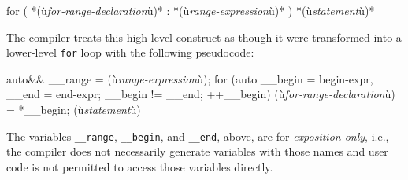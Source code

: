 
\begin{emcppslisting}
for ( *(ù{\it{for-range-declaration}}ù)* : *(ù{\it{range-expression}}ù)* ) *(ù{\it{statement}}ù)*
\end{emcppslisting}
    

\noindent The compiler treats this high-level construct as though it were
transformed into a lower-level \lstinline!for! loop with the following
pseudocode:


\begin{emcppslisting}
{
    auto&& __range = (ù{\it{range-expression}}ù);
    for (auto __begin = begin-expr, __end = end-expr;
        __begin != __end;
        ++__begin)
    {
        (ù{\it{for-range-declaration}}ù) = *__begin;
        (ù{\it{statement}}ù)
    }
}
\end{emcppslisting}
    

\noindent The variables \lstinline!__range!, \lstinline!__begin!, and
\lstinline!__end!, above, are for \emph{exposition only}, i.e., the
compiler does not necessarily generate variables with those names and
user code is not permitted to access those variables directly.

